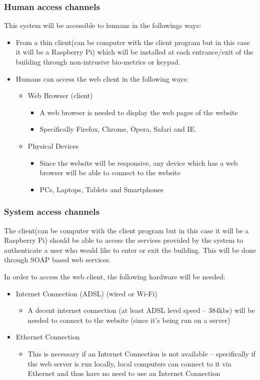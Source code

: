 \subsubsection{Human access channels}
This system will be accessible to humans in the followings ways:

	\begin{itemize}
		\item From a thin client(can be computer with the client program but in this case it will be a Raspberry Pi) which will be installed at each entrance/exit of the building through non-intrusive bio-metrics or keypad.
		\item Humans can access the web client in the following ways:
		\begin{itemize}
			\item Web Browser (client)
				\begin{itemize}
					\item A web browser is needed to display the web pages of the website
					\item Specifically Firefox, Chrome, Opera, Safari and IE.
				\end{itemize}
			\item Physical Devices
			\begin{itemize}
				\item Since the website will be responsive, any device which has a web browser will be able to connect to the website
				\item PCs, Laptops, Tablets and Smartphones
			\end{itemize}
		\end{itemize}
	\end{itemize}
	
\subsubsection{System access channels}
The client(can be computer with the client program but in this case it will be a Raspberry Pi) should be able to access the services provided by the system to authenticate a user who would like to enter or exit the building. This will be done through SOAP based web services.

In order to access the web client, the following hardware will be needed:
\begin{itemize}
	\item Internet Connection (ADSL) (wired or Wi-Fi)
	\begin{itemize}
		\item A decent internet connection (at least ADSL level speed – 384kbs) will be needed to connect to the website (since it’s being run on a server)
	\end{itemize}
	\item Ethernet Connection
	\begin{itemize}
		\item This is necessary if an Internet Connection is not available – specifically if the web server is run locally, local computers can connect to it via Ethernet and thus have no need to use an Internet Connection
	\end{itemize}
\end{itemize}

